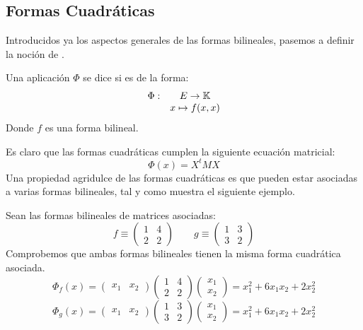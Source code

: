\subsection{Formas Cuadráticas}
Introducidos ya los aspectos generales de las formas bilineales, pasemos a definir la noción de .
\begin{defi}
	Una aplicación $\Phi$ se dice  si es de la forma:
	\[\begin{array}{cc}
	\Phi: & E\to \mathbb{K}\\
	& x\mapsto f(x,x)
	\end{array}\]
	Donde $f$ es una forma bilineal.
\end{defi}
Es claro que las formas cuadráticas cumplen la siguiente ecuación matricial:
\begin{equation}
\label{C8_eq_ecuacionCuadraticas}
	\Phi(x)=X^tMX
\end{equation}
Una propiedad agridulce de las formas cuadráticas es que pueden estar asociadas a varias formas bilineales, tal y como muestra el siguiente ejemplo.
\begin{exa}
	Sean las formas bilineales de matrices asociadas:
	\[f\equiv\begin{pmatrix}
	1 & 4\\
	2 & 2
	\end{pmatrix}\qquad g\equiv\begin{pmatrix}
	1 & 3\\
	3 & 2
	\end{pmatrix}\]
	Comprobemos que ambas formas bilineales tienen la misma forma cuadrática asociada.
	\[\Phi_f(x)=\begin{pmatrix}
	x_1 & x_2
	\end{pmatrix}\begin{pmatrix}
	1 & 4\\
	2 & 2
	\end{pmatrix}\begin{pmatrix}
	x_1\\
	x_2
	\end{pmatrix}=x_1^2+6x_1x_2+2x_2^2\]
	\[\Phi_g(x)=\begin{pmatrix}
	x_1 & x_2
	\end{pmatrix}\begin{pmatrix}
	1 & 3\\
	3 & 2
	\end{pmatrix}\begin{pmatrix}
	x_1\\
	x_2
	\end{pmatrix}=x_1^2+6x_1x_2+2x_2^2\]
\end{exa}
